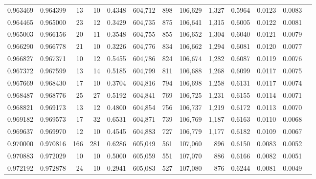 \begin{tabular}{rrrrrrrrrrrrr}
0.963469 & 0.964399 &    13 &  10 &                                     0.4348 & 604,712 &     898 & 106,629 &   1,327 & 0.5964 & 0.0123 & 0.0083 \\
0.964465 & 0.965000 &    23 &  12 &                                     0.3429 & 604,735 &     875 & 106,641 &   1,315 & 0.6005 & 0.0122 & 0.0081 \\
0.965003 & 0.966156 &    20 &  11 &                                     0.3548 & 604,755 &     855 & 106,652 &   1,304 & 0.6040 & 0.0121 & 0.0079 \\
0.966290 & 0.966778 &    21 &  10 &                                     0.3226 & 604,776 &     834 & 106,662 &   1,294 & 0.6081 & 0.0120 & 0.0077 \\
0.966827 & 0.967371 &    10 &  12 &                                     0.5455 & 604,786 &     824 & 106,674 &   1,282 & 0.6087 & 0.0119 & 0.0076 \\
0.967372 & 0.967599 &    13 &  14 &                                     0.5185 & 604,799 &     811 & 106,688 &   1,268 & 0.6099 & 0.0117 & 0.0075 \\
0.967669 & 0.968430 &    17 &  10 &                                     0.3704 & 604,816 &     794 & 106,698 &   1,258 & 0.6131 & 0.0117 & 0.0074 \\
0.968487 & 0.968776 &    25 &  27 &                                     0.5192 & 604,841 &     769 & 106,725 &   1,231 & 0.6155 & 0.0114 & 0.0071 \\
0.968821 & 0.969173 &    13 &  12 &                                     0.4800 & 604,854 &     756 & 106,737 &   1,219 & 0.6172 & 0.0113 & 0.0070 \\
0.969182 & 0.969573 &    17 &  32 &                                     0.6531 & 604,871 &     739 & 106,769 &   1,187 & 0.6163 & 0.0110 & 0.0068 \\
0.969637 & 0.969970 &    12 &  10 &                                     0.4545 & 604,883 &     727 & 106,779 &   1,177 & 0.6182 & 0.0109 & 0.0067 \\
0.970000 & 0.970816 &   166 & 281 &                                     0.6286 & 605,049 &     561 & 107,060 &     896 & 0.6150 & 0.0083 & 0.0052 \\
0.970883 & 0.972029 &    10 &  10 &                                     0.5000 & 605,059 &     551 & 107,070 &     886 & 0.6166 & 0.0082 & 0.0051 \\
0.972192 & 0.972878 &    24 &  10 &                                     0.2941 & 605,083 &     527 & 107,080 &     876 & 0.6244 & 0.0081 & 0.0049 \\

\end{tabular}
